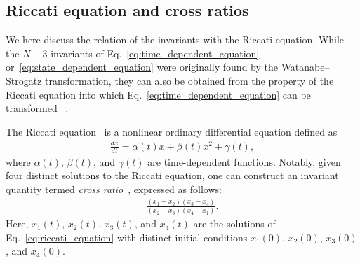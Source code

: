 \documentclass[
amsmath,amssymb,
]{revtex4-2}
\begin{document}
\subsection{Riccati equation and cross ratios}

We here discuss the relation of the invariants with the Riccati equation.
%
While the $N-3$ invariants of Eq.~\eqref{eq:time_dependent_equation} or~\eqref{eq:state_dependent_equation} were originally found by the Watanabe--Strogatz transformation, they can also be obtained from the property of the Riccati equation into which Eq.~\eqref{eq:time_dependent_equation} can be transformed ~\cite{Watanabe1994constants,Marvel2009identical}.
 
The Riccati equation~\cite{reid1972riccati} is a nonlinear ordinary differential equation defined as
\begin{align}
    \label{eq:riccati_equation}
    \frac{dx}{dt} = \alpha(t)x + \beta(t)x^2 + \gamma(t),
\end{align}
where $\alpha(t)$, $\beta(t)$, and $\gamma(t)$ are time-dependent functions. Notably, given four distinct solutions to the Riccati equation, one can construct an invariant quantity termed \textit{cross ratio}~\cite{reid1972riccati}, expressed as follows:
\begin{align}
    \label{eq:cross_ratio}
    \frac{(x_1 - x_2)(x_3 - x_4)}{(x_2 - x_3)(x_4 - x_1)}.
\end{align}
Here, $x_1(t)$, $x_2(t)$, $x_3(t)$, and $x_4(t)$ are the solutions of Eq.~\eqref{eq:riccati_equation} with distinct initial conditions $x_1(0)$, $x_2(0)$, $x_3(0)$, and $x_4(0)$.
\end{document}
